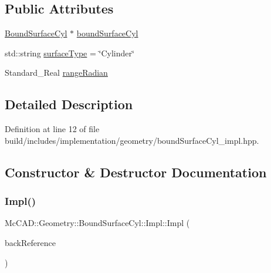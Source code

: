 \subsection*{Public Attributes}
\begin{DoxyCompactItemize}
\item 
\hyperlink{classMcCAD_1_1Geometry_1_1BoundSurfaceCyl}{Bound\+Surface\+Cyl} $\ast$ \hyperlink{classMcCAD_1_1Geometry_1_1BoundSurfaceCyl_1_1Impl_a0b0405eb48ad796bd99abe5af5b994ca}{bound\+Surface\+Cyl}
\item 
std\+::string \hyperlink{classMcCAD_1_1Geometry_1_1BoundSurfaceCyl_1_1Impl_a10a88fd73ad2af8802e641733e5066dd}{surface\+Type} = \char`\"{}Cylinder\char`\"{}
\item 
Standard\+\_\+\+Real \hyperlink{classMcCAD_1_1Geometry_1_1BoundSurfaceCyl_1_1Impl_ac40ad6964d82450fa6606efd82ac824f}{range\+Radian}
\end{DoxyCompactItemize}


\subsection{Detailed Description}


Definition at line 12 of file build/includes/implementation/geometry/bound\+Surface\+Cyl\+\_\+impl.\+hpp.



\subsection{Constructor \& Destructor Documentation}
\mbox{\label{classMcCAD_1_1Geometry_1_1BoundSurfaceCyl_1_1Impl_a7cfaf77f2f5a1abbb226f2ff2ce88602}} 
\subsubsection{\texorpdfstring{Impl()}{Impl()}\hspace{0.1cm}{\footnotesize\ttfamily [1/2]}}
{\footnotesize\ttfamily Mc\+C\+A\+D\+::\+Geometry\+::\+Bound\+Surface\+Cyl\+::\+Impl\+::\+Impl (\begin{DoxyParamCaption}\item[{\hyperlink{classMcCAD_1_1Geometry_1_1BoundSurfaceCyl}{Bound\+Surface\+Cyl} $\ast$}]{back\+Reference }\end{DoxyParamCaption})}



